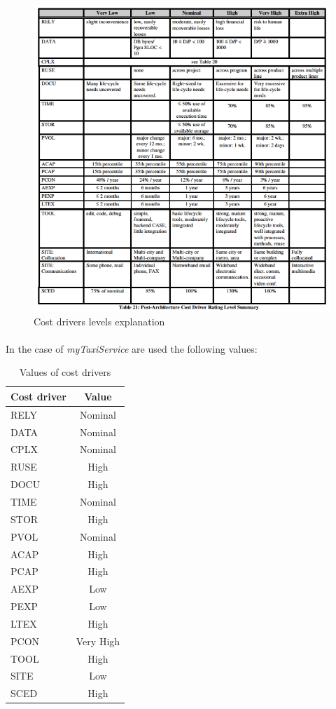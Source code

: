 \begin{figure}[H]
\centering
\includegraphics[trim = +40 0 0 0,scale=0.8]{Size_Cost_Effort/costDriversTable}
\caption{Cost drivers levels explanation}
\end{figure}

\paragraph{}In the case of \textit{myTaxiService} are used the following values:
\begin{table}[H]
\centering
\begin{tabular}{l | c}
\textbf{Cost driver} & \textbf{Value} \\ \hline
RELY & Nominal\\ \hline
DATA & Nominal\\ \hline
CPLX & Nominal\\ \hline
RUSE & High\\ \hline
DOCU & High\\ \hline \hline
TIME & Nominal \\ \hline
STOR & High \\ \hline
PVOL & Nominal \\ \hline \hline
ACAP & High \\ \hline
PCAP & High \\ \hline
AEXP & Low \\ \hline
PEXP & Low \\ \hline
LTEX & High \\ \hline
PCON & Very High \\ \hline \hline
TOOL & High \\ \hline
SITE & Low \\ \hline
SCED & High
\end{tabular}
\caption{Values of cost drivers}
\end{table}

